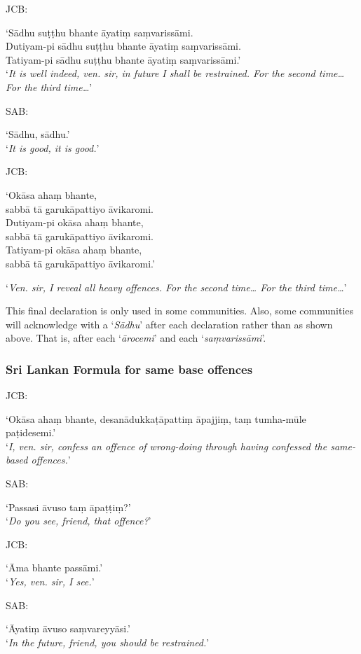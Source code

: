 JCB:

‘Sādhu suṭṭhu bhante āyatiṃ saṃvarissāmi.\\
Dutiyam-pi sādhu suṭṭhu bhante āyatiṃ saṃvarissāmi.\\
Tatiyam-pi sādhu suṭṭhu bhante āyatiṃ saṃvarissāmi.’\\
‘\emph{It is well indeed, ven. sir, in future I shall be restrained. For the second time…For the third time…}’

SAB:

‘Sādhu, sādhu.’\\
‘\emph{It is good, it is good.}’

JCB:

‘Okāsa ahaṃ bhante,\\
sabbā tā garukāpattiyo āvikaromi.\\
Dutiyam-pi okāsa ahaṃ bhante,\\
sabbā tā garukāpattiyo āvikaromi.\\
Tatiyam-pi okāsa ahaṃ bhante,\\
sabbā tā garukāpattiyo āvikaromi.’

‘\emph{Ven. sir, I reveal all heavy offences. For the second time… For the third time…}’

This final declaration is only used in some communities. Also, some communities
will acknowledge with a ‘\emph{Sādhu}’ after each declaration rather than as
shown above. That is, after each ‘\emph{ārocemi}’ and each
‘\emph{saṃvarissāmi}’.

\subsubsection{Sri Lankan Formula for same base offences}

JCB:

‘Okāsa ahaṃ bhante, desanādukkaṭāpattiṃ āpajjiṃ, taṃ tumha-mūle paṭidesemi.’\\
‘\emph{I, ven. sir, confess an offence of wrong-doing through having confessed the same-based offences.}’

SAB:

‘Passasi āvuso taṃ āpaṭṭiṃ?’\\
‘\emph{Do you see, friend, that offence?}’

JCB:

‘Āma bhante passāmi.’\\
‘\emph{Yes, ven. sir, I see.}’

SAB:

‘Āyatiṃ āvuso saṃvareyyāsi.’\\
‘\emph{In the future, friend, you should be restrained.}’

